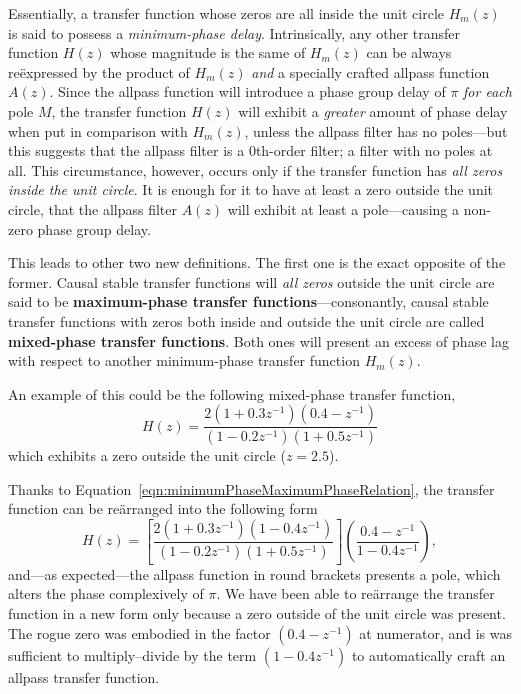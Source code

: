 \documentclass[\documentfontsize, twocolumn]{\classname}
\begin{document}
Essentially, a transfer function whose zeros are all inside the unit circle $H_m(z)$ is said to possess a \emph{minimum-phase delay}. Intrinsically, any other transfer function $H(z)$ whose magnitude is the same of $H_m(z)$ can be always re\"expressed by the product of $H_m(z)$ \emph{and} a specially crafted allpass function $A(z)$. Since the allpass function will introduce a phase group delay of $\pi$ \emph{for each} pole $M$, the transfer function $H(z)$ will exhibit a \emph{greater} amount of phase delay when put in comparison with $H_m(z)$, unless the allpass filter has no poles---but this suggests that the allpass filter is a $0$th-order filter; a filter with no poles at all. This circumstance, however, occurs only if the transfer function has \emph{all zeros inside the unit circle}. It is enough for it to have at least a zero outside the unit circle, that the allpass filter $A(z)$ will exhibit at least a pole---causing a non-zero phase group delay.

This leads to other two new definitions. The first one is the exact opposite of the former. Causal stable transfer functions will \emph{all zeros} outside the unit circle are said to be \textbf{maximum-phase transfer functions}---consonantly, causal stable transfer functions with zeros both inside and outside the unit circle are called \textbf{mixed-phase transfer functions}. Both ones will present an excess of phase lag with respect to another minimum-phase transfer function $H_m(z)$.

An example of this could be the following mixed-phase transfer function,
\[
    H(z) = \frac{
        2(1 + 0.3z^{-1})(0.4 - z^{-1})
    } {
        (1-0.2z^{-1})(1 + 0.5z^{-1})
    }
\]
which exhibits a zero outside the unit circle ($z = 2.5$).

Thanks to Equation~\ref{eqn:minimumPhaseMaximumPhaseRelation}, the transfer function can be re\"arranged into the following form
\[
    H(z) = \left[\frac{
        2(1+0.3z^{-1})(1-0.4z^{-1})
    } {
        (1-0.2z^{-1})(1+0.5z^{-1})
    }\right] \left( \frac{
        0.4 - z^{-1}
    } {
        1 - 0.4z^{-1}
    }\right),
\]
and---as expected---the allpass function in round brackets presents a pole, which alters the phase complexively of $\pi$. We have been able to re\"arrange the transfer function in a new form only because a zero outside of the unit circle was present. The rogue zero was embodied in the factor $(0.4 - z^{-1})$ at numerator, and is was sufficient to multiply--divide by the term $(1 - 0.4z^{-1})$ to automatically craft an allpass transfer function.
\end{document}
